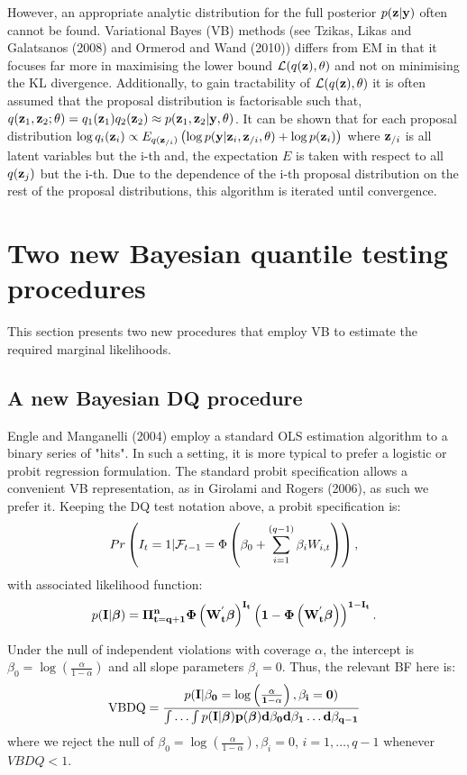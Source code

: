 \documentclass[12pt,epsf]{article}
\newcommand{\utwi}[1]{\mbox{\boldmath $ #1$}}
\newcommand{\calF}{{\cal F}}
\begin{document}
However, an appropriate analytic distribution for the full posterior $p(\mathbf{z}|\mathbf{y})$ often cannot be found. Variational Bayes (VB)
methods (see Tzikas, Likas and Galatsanos (2008) and
Ormerod and Wand (2010)) differs from EM in that it focuses far more in maximising the lower bound $\mathcal{L}(q(\mathbf{z}),\theta)$ and not on minimising the KL divergence. Additionally, to gain tractability of $\mathcal{L}(q(\mathbf{z}),\theta)$ it is often assumed that the proposal distribution is factorisable such that, $q(\mathbf{z}_1,\mathbf{z}_2;\theta)=q_1(\mathbf{z}_1)q_2(\mathbf{z}_2)\approx p(\mathbf{z}_1,\mathbf{z}_2|\mathbf{y},\theta)$.
It can be shown that for each proposal distribution $\log q_i(\mathbf{z}_i) \propto E_{q(\mathbf{z}_{/i})}\left(\log p(\mathbf{y} | \mathbf{z}_i,\mathbf{z}_{/i},\theta)+\log p(\mathbf{z}_i)\right)$ where $\mathbf{z}_{/i}$ is all latent variables but the i-th and, the expectation $E$ is taken with respect to all $q(\mathbf{z}_j)$ but the i-th. Due to the dependence of the i-th proposal distribution on the rest of the proposal distributions, this algorithm is iterated until convergence.


\section{Two new Bayesian quantile testing procedures}
This section presents two new procedures that employ VB to estimate the required marginal likelihoods.

\subsection{A new Bayesian DQ procedure}
Engle and Manganelli (2004) employ a standard OLS estimation algorithm to a binary series of "hits". In such a setting, it is more
typical to prefer a logistic or probit regression formulation. The standard probit specification allows a
convenient VB representation, as in Girolami and Rogers (2006), as such we prefer it. Keeping the DQ test notation
above, a probit specification is:
$$ Pr\clrbracket{I_t=1 | \calF_{t-1} = \Phi \left(\beta_0 + \sum_{i=1}^{(q-1)} \beta_i W_{i,t}\right)},$$
with associated likelihood function:
$$
p(\bf{I}|\utwi{\beta}) = \Pi_{t=q+1}^{n} \Phi\left(W_t^{'}\utwi{\beta} \right)^{I_t} \left(1-\Phi\left(W_t^{'}\utwi{\beta} \right)\right)^{1-I_t}.
$$

Under the null of independent violations with coverage $\alpha$, the intercept is
$\beta_0 = \log\left(\frac{\alpha}{1-\alpha}\right)$ and all slope parameters $\beta_i = 0$. Thus, the relevant BF here is:
\begin{eqnarray*}
\mbox{VBDQ} = \frac{ p(\bf{I}| \beta_0 = \log\left(\frac{\alpha}{1-\alpha}\right), \beta_i=0)}
              { \int \ldots \int p(\bf {I}|\utwi{\beta}) p(\utwi{\beta}) d \beta_0 d \beta_1 \ldots d \beta_{q-1} }
\end{eqnarray*}
where we reject the null of $\beta_0=\log\left(\frac{\alpha}{1-\alpha}\right), \beta_i=0$, $i=1,\ldots,q-1$
whenever $VBDQ<1$.
\end{document}
